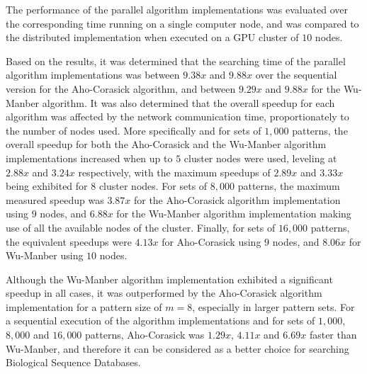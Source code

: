 \documentclass{ws-ijait}
\begin{document}
The performance of the parallel algorithm implementations was evaluated over the corresponding time running on a single computer node, and was compared to the distributed implementation when executed on a GPU cluster of $10$ nodes. 

Based on the results, it was determined that the searching time of the parallel algorithm implementations was between $9.38x$ and $9.88x$ over the sequential version for the Aho-Corasick algorithm, and between $9.29x$ and $9.88x$ for the Wu-Manber algorithm. It was also determined that the overall speedup for each algorithm was affected by the network communication time, proportionately to the number of nodes used. More specifically and for sets of $1,000$ patterns, the overall speedup for both the Aho-Corasick and the Wu-Manber algorithm implementations increased when up to $5$ cluster nodes were used, leveling at $2.88x$ and $3.24x$ respectively, with the maximum speedups of $2.89x$ and $3.33x$ being exhibited for $8$ cluster nodes. For sets of $8,000$ patterns, the maximum measured speedup was $3.87x$ for the Aho-Corasick algorithm implementation using $9$ nodes, and $6.88x$ for the Wu-Manber algorithm implementation making use of all the available nodes of the cluster. Finally, for sets of $16,000$ patterns, the equivalent speedups were $4.13x$ for Aho-Corasick using $9$ nodes, and $8.06x$ for Wu-Manber using $10$ nodes.

Although the Wu-Manber algorithm implementation exhibited a significant speedup in all cases, it was outperformed by the Aho-Corasick algorithm implementation for a pattern size of $m=8$, especially in larger pattern sets. For a sequential execution of the algorithm implementations and for sets of $1,000$, $8,000$ and $16,000$ patterns, Aho-Corasick was $1.29x$, $4.11x$ and $6.69x$ faster than Wu-Manber, and therefore it can be considered as a better choice for searching Biological Sequence Databases.



\end{document}
